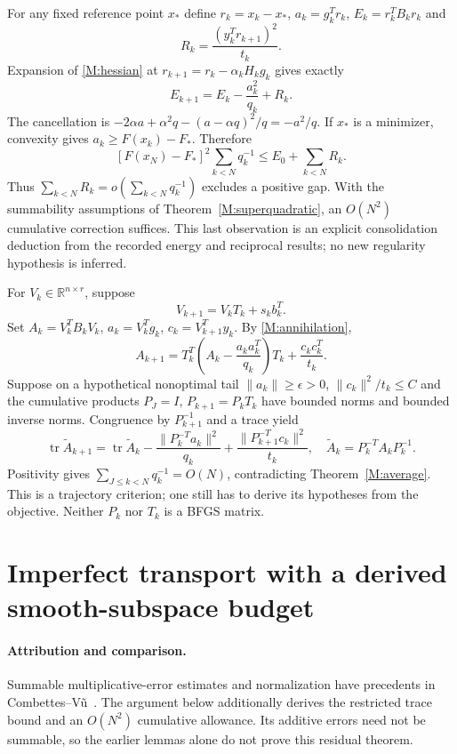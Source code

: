 For any fixed reference point $x_*$ define $r_k=x_k-x_*$, $a_k=g_k^Tr_k$, $E_k=r_k^TB_kr_k$ and
\[
 R_k=\frac{(y_k^Tr_{k+1})^2}{t_k}.
\]
Expansion of \eqref{M:hessian} at $r_{k+1}=r_k-\alpha_kH_kg_k$ gives exactly
\begin{equation}\label{M:fixedenergy}
 E_{k+1}=E_k-\frac{a_k^2}{q_k}+R_k.
\end{equation}
The cancellation is $-2\alpha a+\alpha^2q-(a-\alpha q)^2/q=-a^2/q$. If $x_*$ is a minimizer, convexity gives $a_k\ge F(x_k)-F_*$. Therefore
\begin{equation}\label{M:energybound}
 [F(x_N)-F_*]^2\sum_{k<N}q_k^{-1}\le E_0+\sum_{k<N}R_k.
\end{equation}
Thus $\sum_{k<N}R_k=o(\sum_{k<N}q_k^{-1})$ excludes a positive gap. With the summability assumptions of Theorem~\ref{M:superquadratic}, an $O(N^2)$ cumulative correction suffices. This last observation is an explicit consolidation deduction from the recorded energy and reciprocal results; no new regularity hypothesis is inferred.

For $V_k\in\mathbb R^{n\times r}$, suppose
\[
 V_{k+1}=V_kT_k+s_kb_k^T.
\]
Set $A_k=V_k^TB_kV_k$, $a_k=V_k^Tg_k$, $c_k=V_{k+1}^Ty_k$. By \eqref{M:annihilation},
\begin{equation}\label{M:frameidentity}
 A_{k+1}=T_k^T\left(A_k-\frac{a_ka_k^T}{q_k}\right)T_k+\frac{c_kc_k^T}{t_k}.
\end{equation}
Suppose on a hypothetical nonoptimal tail $\|a_k\|\ge\epsilon>0$, $\|c_k\|^2/t_k\le C$ and the cumulative products $P_J=I$, $P_{k+1}=P_kT_k$ have bounded norms and bounded inverse norms. Congruence by $P_{k+1}^{-1}$ and a trace yield
\[
 \operatorname{tr}\widetilde A_{k+1}=\operatorname{tr}\widetilde A_k
 -\frac{\|P_k^{-T}a_k\|^2}{q_k}
 +\frac{\|P_{k+1}^{-T}c_k\|^2}{t_k},\quad
 \widetilde A_k=P_k^{-T}A_kP_k^{-1}.
\]
Positivity gives $\sum_{J\le k<N}q_k^{-1}=O(N)$, contradicting Theorem~\ref{M:average}. This is a trajectory criterion; one still has to derive its hypotheses from the objective. Neither $P_k$ nor $T_k$ is a BFGS matrix.

\section{Imperfect transport with a derived smooth-subspace budget}
\label{M:residual}
\paragraph{Attribution and comparison.}
Summable multiplicative-error estimates and normalization have precedents in Combettes--V\~u~\cite[Lemmas 2.2--2.3]{FND_CV13}. The argument below additionally derives the restricted trace bound and an $O(N^2)$ cumulative allowance. Its additive errors need not be summable, so the earlier lemmas alone do not prove this residual theorem.

